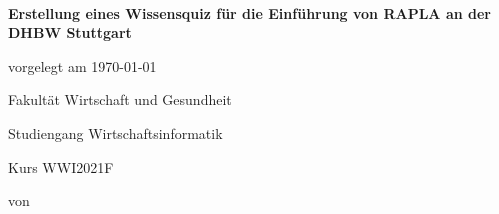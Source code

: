\begin{spacing}{1}
\begin{center}	
~\vspace{0mm}

{\sffamily
\LARGE  
\textbf{Erstellung eines Wissensquiz für die Einführung von RAPLA an der DHBW Stuttgart}

}


\vspace{15mm}

{\Large \typMeinerArbeit}

\vspace{1cm}

vorgelegt am \today 

\vspace{15mm}

Fakultät Wirtschaft und Gesundheit
\medskip

Studiengang Wirtschaftsinformatik
\medskip

Kurs WWI2021F 

\vspace{10mm}

von

\vspace{10mm}

{\large\textsc{\meinNameSB}}
\medskip

{\large\textsc{\meinNameLG}}
\medskip

{\large\textsc{\meinNameTK}}
\medskip

{\large\textsc{\meinNameSS}}
\medskip

{\large\textsc{\meinNameDS}}
\medskip

\vspace{10mm}
\end{center}

\vfill




\vspace{1cm}
\end{spacing}

 

